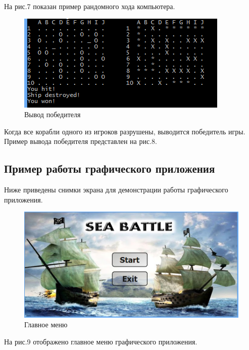 \documentclass[a4paper]{article}
\begin{document}
На рис.7 показан пример рандомного хода компьютера.

\begin{figure}[H]
	\begin{center}
		\includegraphics[scale=0.6]{screen/console_winner.png}
		\caption{Вывод победителя} 
		\label{pic:pic_name} %
	\end{center}
\end{figure}

Когда все корабли одного из игроков разрушены, выводится победитель игры. Пример вывода победителя представлен на рис.8.

\newpage

\subsection{Пример работы графического приложения}

Ниже приведены снимки экрана для демонстрации работы графического приложения.

\begin{figure}[H]
	\begin{center}
		\includegraphics[scale=0.5]{screen/GUI_menu.png}
		\caption{Главное меню} 
		\label{pic:pic_name} %
	\end{center}
\end{figure}

На рис.9 отображено главное меню графического приложения.
\end{document}
